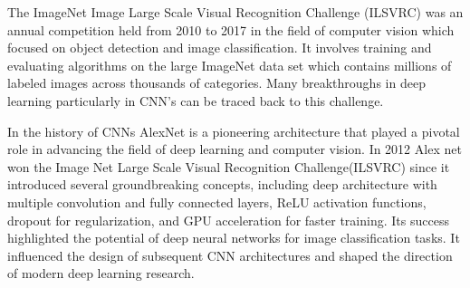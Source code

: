 \documentclass[
a4paper, 
12pt,
grayscalebody, %
abstract=on,
twoside, BCOR10mm, 12pt, DIV13,headinclude, footexclude, final, abstracton, openright
]{ibireprt}
\numberwithin{equation}{chapter}
\numberwithin{table}{chapter}
\numberwithin{figure}{chapter}
\numberwithin{algorithm}{chapter}
\numberwithin{example}{chapter}
\numberwithin{example}{chapter}
\begin{document}
The ImageNet Image Large Scale Visual Recognition Challenge (ILSVRC) was an annual competition held from 2010 to 2017 in the field of computer vision which focused on object detection and image classification. It involves training and evaluating algorithms on the large ImageNet data set which contains millions of labeled images across thousands of categories. Many breakthroughs in deep learning particularly in CNN's can be traced back to this challenge.

In the history of CNNs AlexNet is a pioneering architecture that played a pivotal role in advancing the field of deep learning and computer vision. \cite{Alzubaidi2021} In 2012 Alex net won the Image Net Large Scale Visual Recognition Challenge(ILSVRC) since it introduced several groundbreaking concepts, including deep architecture with multiple convolution and fully connected layers, ReLU activation functions, dropout for regularization, and GPU acceleration for faster training. Its success highlighted the potential of deep neural networks for image classification tasks. It influenced the design of subsequent CNN architectures and shaped the direction of modern deep learning research.
\end{document}
